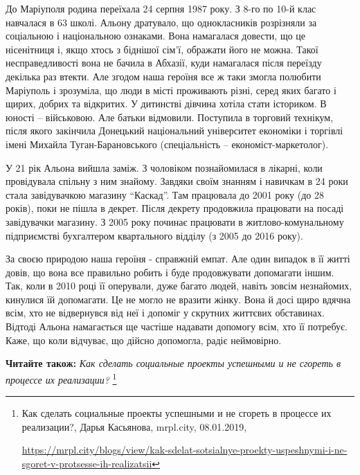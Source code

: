 До Маріуполя родина переїхала 24 серпня 1987 року. З 8-го по 10-й клас
навчалася в 63 школі. Альону дратувало, що однокласників розрізняли за
соціальною і національною ознаками. Вона намагалася довести, що це нісенітниця
і, якщо хтось з біднішої сім'ї, ображати його не можна. Такої несправедливості
вона не бачила в Абхазії, куди намагалася після переїзду декілька раз втекти.
Але згодом наша героїня все ж таки змогла полюбити Маріуполь і зрозуміла, що
люди в місті проживають різні, серед яких багато і щирих, добрих та відкритих.
У дитинстві дівчина хотіла стати істориком. В юності – військовою. Але батьки
відмовили. Поступила в торговий технікум, після якого закінчила Донецький
національний університет економіки і торгівлі імені Михайла Туган-Барановського
(спеціальність – економіст-маркетолог). 


У 21 рік Альона вийшла заміж. З чоловіком познайомилася в лікарні, коли
провідувала спільну з ним знайому. Завдяки своїм знанням і навичкам в 24 роки
стала завідувачкою магазину \enquote{Каскад}. Там працювала до 2001 року (до 28 років),
поки не пішла в декрет. Після декрету продовжила працювати на посаді
завідувачки магазину. З 2005 року починає працювати в житлово-комунальному
підприємстві бухгалтером квартального відділу (з 2005 до 2016 року).


За своєю природою наша героїня - справжній емпат. Але один випадок в її житті
довів, що вона все правильно робить і буде продовжувати допомагати іншим. Так,
коли в 2010 році її оперували, дуже багато людей, навіть зовсім незнайомих,
кинулися їй допомагати. Це не могло не вразити жінку. Вона й досі щиро вдячна
всім, хто не відвернувся від неї і допоміг у скрутних життєвих обставинах.
Відтоді Альона намагається ще частіше надавати допомогу всім, хто її потребує.
Каже, що коли відчуває, що дійсно допомогла, радіє неймовірно.

\textbf{Читайте також:} \emph{Как сделать социальные проекты успешными и не сгореть в процессе их реализации?}%
\footnote{Как сделать социальные проекты успешными и не сгореть в процессе их реализации?, Дарья Касьянова, mrpl.city, 08.01.2019, \par%
\url{https://mrpl.city/blogs/view/kak-sdelat-sotsialnye-proekty-uspeshnymi-i-ne-sgoret-v-protsesse-ih-realizatsii}
}

